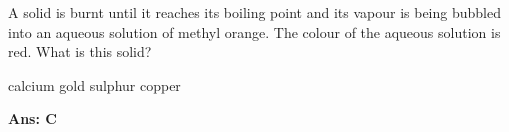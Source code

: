 \documentclass[border=3pt,varwidth=70mm]{standalone}
\begin{document}
A solid is burnt until it reaches its boiling point and its vapour is being bubbled into an aqueous solution of methyl orange. The colour of the aqueous solution is red. What is this solid?

\begin{choices}
\choice calcium
\choice gold
\choice sulphur
\choice copper
\end{choices}

\begin{answer}
\hrulefill\par
\textbf{Ans: C}


\end{answer}
\end{document}
